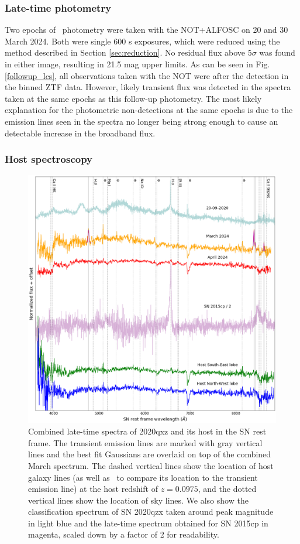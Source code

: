 \documentclass[a4paper,oneside,12pt, class=Latex/Classes/PhDthesisPSnPDF, crop=false]{standalone}
\begin{document}
\subsubsection{Late-time photometry}
Two epochs of \ztfi\ photometry were taken with the NOT+ALFOSC on 20 and 30 March 2024. Both were single 600 s exposures, which were reduced using the method described in Section \ref{sec:reduction}. No residual flux above $5\sigma$ was found in either image, resulting in 21.5 mag upper limits. As can be seen in Fig. \ref{followup_lcs}, all observations taken with the NOT were after the detection in the binned ZTF data. However, likely transient flux was detected in the spectra taken at the same epochs as this follow-up photometry. The most likely explanation for the photometric non-detections at the same epochs is due to the emission lines seen in the spectra no longer being strong enough to cause an detectable increase in the broadband flux. 


\subsubsection{Host spectroscopy}
\label{2020qxz_host_specs}
\begin{figure}
    \centering
    \includegraphics[width=\textwidth]{../Images/chapter_5/2020qxz_spec.png}
    \caption{Combined late-time spectra of 2020qxz and its host in the SN rest frame. The transient emission lines are marked with gray vertical lines and the best fit Gaussians are overlaid on top of the combined March spectrum. The dashed vertical lines show the location of host galaxy lines (as well as \Hbeta\ to compare its location to the transient emission line) at the host redshift of $z=0.0975$, and the dotted vertical lines show the location of sky lines. We also show the classification spectrum of SN 2020qzx taken around peak magnitude in light blue and the late-time spectrum obtained for SN 2015cp in magenta, scaled down by a factor of 2 for readability.}
    \label{2020qxz_spec}
\end{figure}
\end{document}
